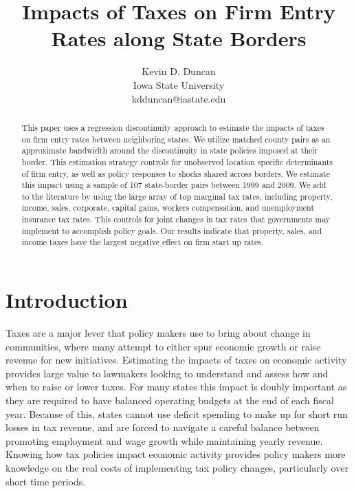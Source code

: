 \documentclass[12pt,a4paper]{article}
\begin{document}
\title{Impacts of Taxes on Firm Entry Rates along State Borders}
\author{Kevin D. Duncan \\ Iowa State University \\ kdduncan@iastate.edu}
\maketitle

\begin{abstract}
This paper uses a regression discontinuity approach to estimate the impacts of taxes on firm entry rates between neighboring states. We utilize matched county pairs as an approximate bandwidth around the discontinuity in state policies imposed at their border. This estimation strategy controls for unobserved location specific determinants of firm entry, as well as policy responses to shocks shared across borders. We estimate this impact using a sample of 107 state-border pairs between 1999 and 2009. We add to the literature by using the large array of top marginal tax rates, including property, income, sales, corporate, capital gains, workers compensation, and unemployment insurance tax rates. This controls for joint changes in tax rates that governments may implement to accomplish policy goals. Our results indicate that property, sales, and income taxes have the largest negative effect on firm start up rates.
\end{abstract}

\newpage

\section{Introduction} 

Taxes are a major lever that policy makers use to bring about change in communities, where many attempt to either spur economic growth or raise revenue for new initiatives. Estimating the impacts of taxes on economic activity provides large value to lawmakers looking to understand and assess how and when to raise or lower taxes. For many states this impact is doubly important as they are required to have balanced operating budgets at the end of each fiscal year. Because of this, states cannot use deficit spending to make up for short run losses in tax revenue, and are forced to navigate a careful balance between promoting employment and wage growth while maintaining yearly revenue. Knowing how tax policies impact economic activity provides policy makers more knowledge on the real costs of implementing tax policy changes, particularly over short time periods.
\end{document}
